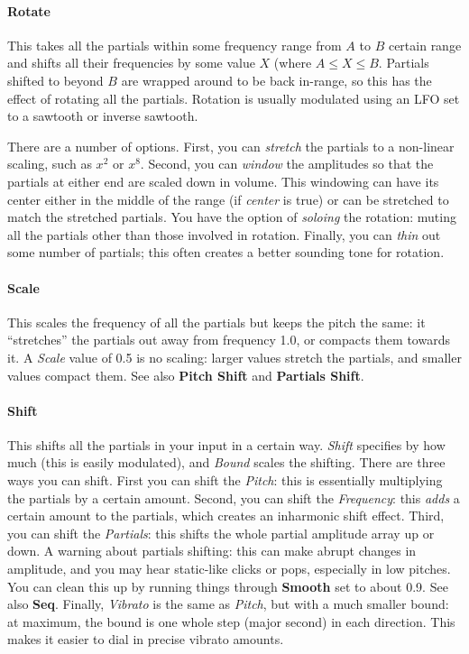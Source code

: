 \documentclass{article}
\begin{document}
\paragraph{Rotate}  This takes all the partials within some frequency range from \(A\) to \(B\) certain range and shifts all their frequencies by some value \(X\) (where \(A \leq X \leq B\).  Partials shifted to beyond \(B\) are wrapped around to be back in-range, so this has the effect of rotating all the partials.  Rotation is usually modulated using an LFO set to a sawtooth or inverse sawtooth.

There are a number of options.  First, you can {\it stretch} the partials to a non-linear scaling, such as \(x^2\) or \(x^8\).  Second, you can {\it window} the amplitudes so that the partials at either end are scaled down in volume.  This windowing can have its center either in the middle of the range (if {\it center} is true) or can be stretched to match the stretched partials.  You have the option of {\it soloing} the rotation: muting all the partials other than those involved in rotation.  Finally, you can {\it thin} out some number of partials; this often creates a better sounding tone for rotation.
 
\paragraph{Scale} This scales the frequency of all the partials but keeps the pitch the same: it ``stretches'' the partials out away from frequency 1.0, or compacts them towards it.  A {\it Scale} value of 0.5 is no scaling: larger values stretch the partials, and smaller values compact them.   See also  {\bf Pitch Shift} and  {\bf Partials Shift}.

\paragraph{Shift} This shifts all the partials in your input in a certain way.  {\it Shift} specifies by how much (this is easily modulated), and {\it Bound} scales the shifting.  There are three ways you can shift.  First you can shift the {\it Pitch}: this is essentially multiplying the partials by a certain amount.  Second, you can shift the {\it Frequency}: this {\it adds} a certain amount to the partials, which creates an inharmonic shift effect.  Third, you can shift the {\it Partials}: this shifts the whole partial amplitude array up or down.  A warning about partials shifting: this can make abrupt changes in amplitude, and you may hear static-like clicks or pops, especially in low pitches.  You can clean this up by running things through {\bf Smooth} set to about 0.9. See also {\bf Seq}.  Finally, {\it Vibrato} is the same as {\it Pitch}, but with a much smaller bound: at maximum, the bound is one whole step (major second) in each direction.  This makes it easier to dial in precise vibrato amounts.
\end{document}

